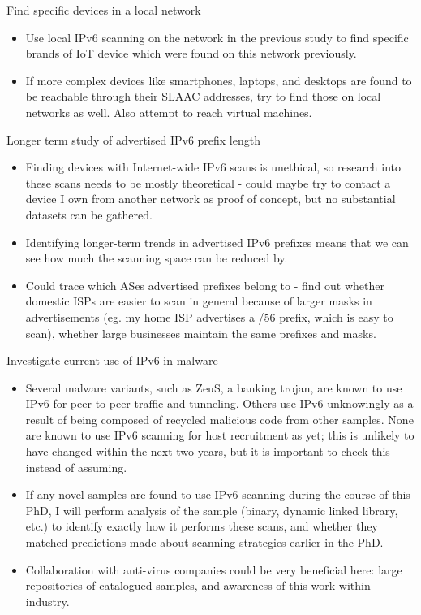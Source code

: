 \documentclass[10pt,sigconf]{acmart}
\begin{document}
Find specific devices in a local network
\begin{itemize}
	\item Use local IPv6 scanning on the network in the previous study to find specific brands of IoT device which were found on this network previously.
	\item If more complex devices like smartphones, laptops, and desktops are found to be reachable through their SLAAC addresses, try to find those on local networks as well. Also attempt to reach virtual machines.
\end{itemize}

Longer term study of advertised IPv6 prefix length
\begin{itemize}
	\item Finding devices with Internet-wide IPv6 scans is unethical, so research into these scans needs to be mostly theoretical - could maybe try to contact a device I own from another network as proof of concept, but no substantial datasets can be gathered.
	\item Identifying longer-term trends in advertised IPv6 prefixes means that we can see how much the scanning space can be reduced by.
	\item Could trace which ASes advertised prefixes belong to - find out whether domestic ISPs are easier to scan in general because of larger masks in advertisements (eg. my home ISP advertises a /56 prefix, which is easy to scan), whether large businesses maintain the same prefixes and masks.
\end{itemize}

Investigate current use of IPv6 in malware
\begin{itemize}
	\item Several malware variants, such as ZeuS, a banking trojan, are known to use IPv6 for peer-to-peer traffic and tunneling.
	Others use IPv6 unknowingly as a result of being composed of recycled malicious code from other samples.
	None are known to use IPv6 scanning for host recruitment as yet;
	this is unlikely to have changed within the next two years, but it is important to check this instead of assuming.
	\item If any novel samples are found to use IPv6 scanning during the course of this PhD, I will perform analysis of the sample (binary, dynamic linked library, etc.) to identify exactly how it performs these scans, and whether they matched predictions made about scanning strategies earlier in the PhD.
	\item Collaboration with anti-virus companies could be very beneficial here:
	large repositories of catalogued samples, and awareness of this work within industry.
\end{itemize}
\end{document}
